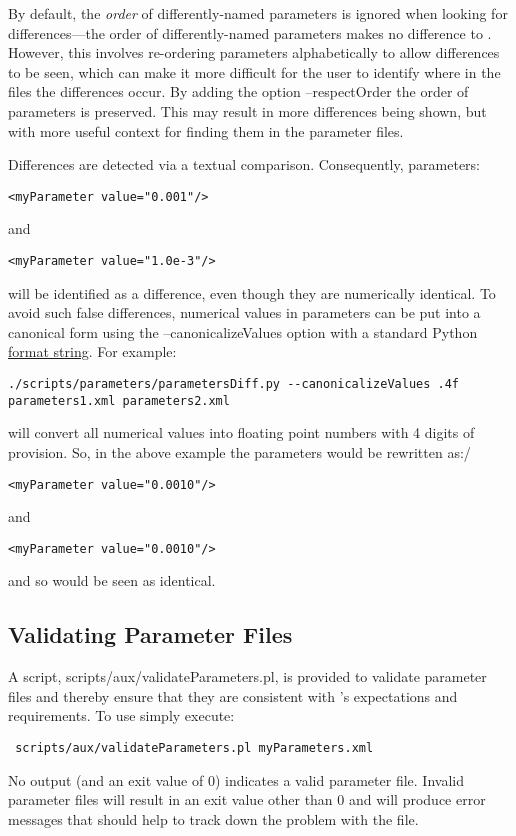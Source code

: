 By default, the \emph{order} of differently-named parameters is ignored when looking for differences---the order of differently-named parameters makes no difference to \glc. However, this involves re-ordering parameters alphabetically to allow differences to be seen, which can make it more difficult for the user to identify where in the files the differences occur. By adding the option {\normalfont \ttfamily --respectOrder} the order of parameters is preserved. This may result in more differences being shown, but with more useful context for finding them in the parameter files. 

Differences are detected via a textual comparison. Consequently, parameters:
\begin{verbatim}
<myParameter value="0.001"/>
\end{verbatim}
and
\begin{verbatim}
<myParameter value="1.0e-3"/>
\end{verbatim}
will be identified as a difference, even though they are numerically identical. To avoid such false differences, numerical values in parameters can be put into a canonical form using the {\normalfont \ttfamily --canonicalizeValues} option with a standard Python \href{https://docs.python.org/3/library/string.html#formatstrings}{format string}. For example:
\begin{verbatim}
./scripts/parameters/parametersDiff.py --canonicalizeValues .4f parameters1.xml parameters2.xml
\end{verbatim}
will convert all numerical values into floating point numbers with 4 digits of provision. So, in the above example the parameters would be rewritten as:/
\begin{verbatim}
<myParameter value="0.0010"/>
\end{verbatim}
and
\begin{verbatim}
<myParameter value="0.0010"/>
\end{verbatim}
and so would be seen as identical.

\subsection{Validating Parameter Files}

A script, {\normalfont \ttfamily scripts/aux/validateParameters.pl}, is provided to validate parameter files and thereby ensure that they are consistent with \glc's expectations and requirements. To use simply execute:
\begin{verbatim}
 scripts/aux/validateParameters.pl myParameters.xml
\end{verbatim}
No output (and an exit value of 0) indicates a valid parameter file. Invalid parameter files will result in an exit value other than 0 and will produce error messages that should help to track down the problem with the file.

